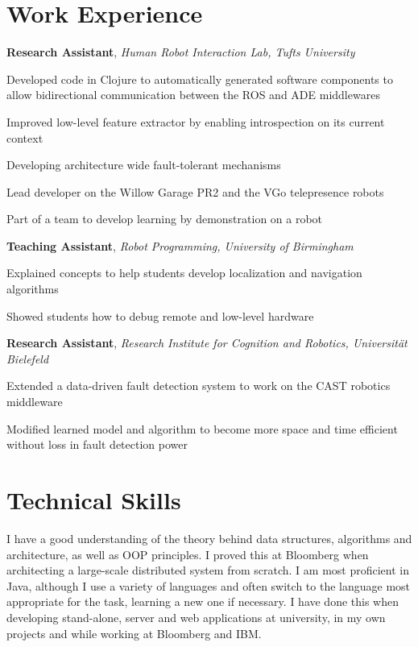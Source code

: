 \documentclass[10pt, letter]{article}
\newcommand{\years}[1]{\marginnote{\scriptsize #1}}
\newenvironment{itemize*}{
  \begin{itemize}
    \setlength{\itemsep}{0pt}
    \setlength{\parskip}{-1pt}
    \setlength{\parsep}{-1pt}
  }{
  \end{itemize}
}
\begin{document}
\section*{Work Experience}
\years{2012--2013}
\textbf{Research Assistant}, \textsl{Human Robot Interaction Lab, Tufts University}
\begin{itemize*}
\item Developed code in Clojure to automatically generated software
  components to allow bidirectional communication between the ROS and
  ADE middlewares
\item Improved low-level feature extractor by enabling introspection on its current context
\item Developing architecture wide fault-tolerant mechanisms
\item Lead developer on the Willow Garage PR2 and the VGo telepresence robots
\item Part of a team to develop learning by demonstration on a robot
\end{itemize*}

\years{2012}
\textbf{Teaching Assistant}, \textsl{Robot Programming, University of Birmingham}
\begin{itemize*}
\item Explained concepts to help students develop localization and navigation algorithms
\item Showed students how to debug remote and low-level hardware
\end{itemize*}

\years{2011}
\textbf{Research Assistant}, \textsl{Research Institute for Cognition and Robotics, Universität Bielefeld}
\begin{itemize*}
\item Extended a data-driven fault detection system to work on the CAST robotics middleware
\item Modified learned model and algorithm to become more space and time efficient without loss in fault detection power
\end{itemize*}

\section*{Technical Skills}
I have a good understanding of the theory behind data structures,
algorithms and architecture, as well as OOP principles. I proved this
at Bloomberg when architecting a large-scale distributed system from
scratch.  I am most proficient in Java, although I use a variety of
languages and often switch to the language most appropriate for the
task, learning a new one if necessary. I have done this when
developing stand-alone, server and web applications at university, in
my own projects and while working at Bloomberg and IBM.
\end{document}
